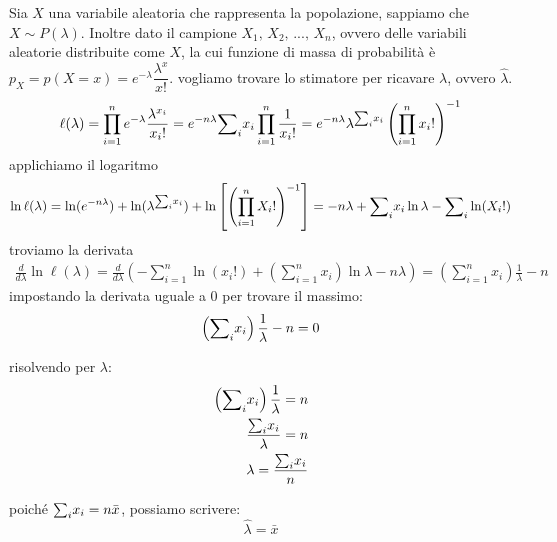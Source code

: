 \begin{esempio}
Sia $X$ una variabile aleatoria che rappresenta la popolazione, sappiamo che $X\sim P(\lambda)$. Inoltre dato il campione $X_1,\, X_2,\, ...,\, X_n$, ovvero delle variabili aleatorie distribuite come $X$, la cui funzione di massa di probabilità è $p_X = p(X = x) = e^{-\lambda}\dfrac{\lambda^x}{x!}$.
vogliamo trovare lo stimatore per ricavare $\lambda$, ovvero $\hat{\lambda}$. \\

\begin{align*}
    \ell(\lambda) = \prod_{i=1}^n e^{-\lambda}\dfrac{\lambda^{x_i}}{x_i!} = e^{-n\lambda}{\sum}_i{x_i} \prod_{i=1}^n \dfrac{1}{x_i!} = e^{-n\lambda} \lambda^{{\sum}_i{x_i}} \left(\prod_{i=1}^n x  _i!\right)^{-1} \\
\end{align*}
\noindent applichiamo il logaritmo
\begin{align*}
    \ln \ell(\lambda) = \ln(e^{-n\lambda}) + \ln (\lambda^{{\sum}_i{x_i}}) + \ln \left[\left(\prod_{i=1}^n X_i!\right)^{-1}\right] = -n\lambda + {\sum}_i{x_i} \ln \lambda - {\sum}_i \ln (X_i!) \\
\end{align*}
\noindent troviamo la derivata
\begin{align*}
    \frac{d}{d\lambda} \ln \ell(\lambda) = \frac{d}{d\lambda} \left( - \sum_{i=1}^n \ln (x_i!) + \left( \sum_{i=1}^n x_i \right) \ln \lambda - n\lambda \right) = \left( \sum_{i=1}^n x_i \right) \frac{1}{\lambda} - n
\end{align*}
\noindent impostando la derivata uguale a $0$ per trovare il massimo:
\[
\left( {\sum}_i x_i \right) \frac{1}{\lambda} - n = 0
\]

\noindent risolvendo per \(\lambda\):
\begin{align*}
    \left( {\sum}_i x_i \right) \frac{1}{\lambda} = n \\
    \frac{{\sum}_i x_i}{\lambda} = n \\
    \lambda = \frac{{\sum}_i x_i}{n}
\end{align*}

\noindent poiché \({\sum}_i x_i = n \bar{x}\), possiamo scrivere:
\[
\hat{\lambda} = \bar{x}
\]
\end{esempio}

